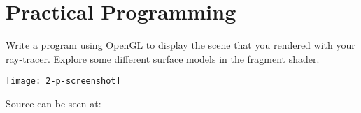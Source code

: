 \documentclass{supervision}
\begin{document}
\section*{Practical Programming}
\begin{questions}
    \question
    Write a program using OpenGL to display the scene that you rendered with your ray-tracer. Explore some different surface models in the fragment shader.
    \begin{solution}
    \begin{center}
        \texttt{[image: 2-p-screenshot]}
    \end{center}
    Source can be seen at: \url{}
    \end{solution}

\end{questions}
\end{document}
